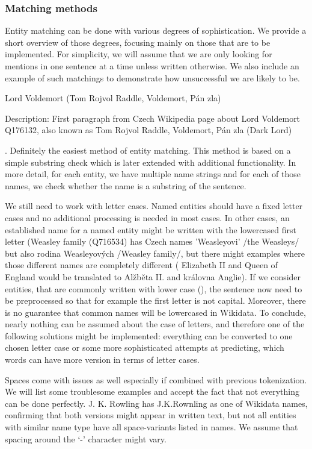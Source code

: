 \subsubsection{Matching methods}
Entity matching can be done with various degrees of sophistication. We provide a short overview of those degrees, focusing mainly on those that are to be implemented. For simplicity, we will assume that we are only looking for mentions in one sentence at a time unless written otherwise. We also include an example of such matchings to demonstrate how unsuccessful we are likely to be.

Lord Voldemort (Tom Rojvol Raddle, Voldemort, Pán zla)

Description: First paragraph from Czech Wikipedia page about Lord Voldemort Q176132, also known as Tom Rojvol Raddle, Voldemort, Pán zla  (Dark Lord) 


. Definitely the easiest method of entity matching. This method is based on a simple substring check which is later extended with additional functionality. In more detail, for each entity, we have multiple name strings and for each of those names, we check whether the name is a substring of the sentence.

We still need to work with letter cases. Named entities should have a fixed letter cases and no additional processing is needed in most cases. In other cases, an established name for a named entity might be written with the lowercased first letter (Weasley family (Q716534) has Czech names 'Weasleyovi' /the Weasleys/ but also rodina Weasleyových /Weasley family/, but there might examples where those different names are completely different ( Elizabeth II and Queen of England would be translated to Alžběta II. and královna Anglie). If we consider entities, that are commonly written with lower case (), the sentence now need to be preprocessed so that for example the first letter is not capital. Moreover, there is no guarantee that common names will be lowercased in Wikidata. To conclude, nearly nothing can be assumed about the case of letters, and therefore one of the following solutions might be implemented: everything can be converted to one chosen letter case or some more sophisticated attempts at predicting, which words can have more version in terms of letter cases.

Spaces come with issues as well especially if combined with previous tokenization. We will list some troublesome examples and accept the fact that not everything can be done perfectly. J. K. Rowling has J.K.Rownling as one of Wikidata names, confirming that both versions might appear in written text, but not all entities with similar name type have all space-variants listed in names. We assume that spacing around the ‘-’ \todo{-} character might vary.

